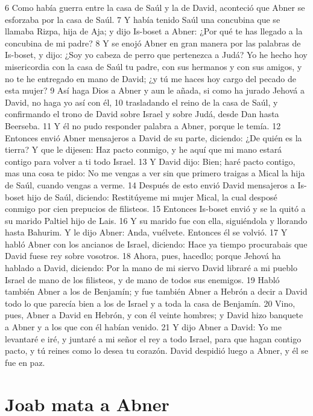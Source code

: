 6 Como había guerra entre la casa de Saúl y la de David, aconteció que Abner se esforzaba por la casa de Saúl.
7 Y había tenido Saúl una concubina que se llamaba Rizpa, hija de Aja; y dijo Is-boset a Abner: ¿Por qué te has llegado a la concubina de mi padre?
8 Y se enojó Abner en gran manera por las palabras de Is-boset, y dijo: ¿Soy yo cabeza de perro que pertenezca a Judá? Yo he hecho hoy misericordia con la casa de Saúl tu padre, con sus hermanos y con sus amigos, y no te he entregado en mano de David; ¿y tú me haces hoy cargo del pecado de esta mujer?
9 Así haga Dios a Abner y aun le añada, si como ha jurado Jehová a David, no haga yo así con él,
10 trasladando el reino de la casa de Saúl, y confirmando el trono de David sobre Israel y sobre Judá, desde Dan hasta Beerseba.
11 Y él no pudo responder palabra a Abner, porque le temía.
12 Entonces envió Abner mensajeros a David de su parte, diciendo: ¿De quién es la tierra? Y que le dijesen: Haz pacto conmigo, y he aquí que mi mano estará contigo para volver a ti todo Israel.
13 Y David dijo: Bien; haré pacto contigo, mas una cosa te pido: No me vengas a ver sin que primero traigas a Mical la hija de Saúl, cuando vengas a verme.
14 Después de esto envió David mensajeros a Is-boset hijo de Saúl, diciendo: Restitúyeme mi mujer Mical, la cual desposé conmigo por cien prepucios de filisteos. 
15 Entonces Is-boset envió y se la quitó a su marido Paltiel hijo de Lais.
16 Y su marido fue con ella, siguiéndola y llorando hasta Bahurim. Y le dijo Abner: Anda, vuélvete. Entonces él se volvió.
17 Y habló Abner con los ancianos de Israel, diciendo: Hace ya tiempo procurabais que David fuese rey sobre vosotros.
18 Ahora, pues, hacedlo; porque Jehová ha hablado a David, diciendo: Por la mano de mi siervo David libraré a mi pueblo Israel de mano de los filisteos, y de mano de todos sus enemigos. 
19 Habló también Abner a los de Benjamín; y fue también Abner a Hebrón a decir a David todo lo que parecía bien a los de Israel y a toda la casa de Benjamín.
20 Vino, pues, Abner a David en Hebrón, y con él veinte hombres; y David hizo banquete a Abner y a los que con él habían venido.
21 Y dijo Abner a David: Yo me levantaré e iré, y juntaré a mi señor el rey a todo Israel, para que hagan contigo pacto, y tú reines como lo desea tu corazón. David despidió luego a Abner, y él se fue en paz.
\section*{Joab mata a Abner}

